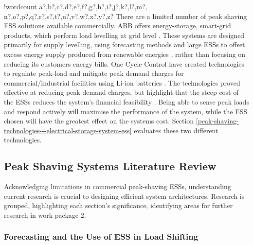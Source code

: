 \documentclass[fontsize=9.5pt]{extarticle}
\newcounter{words}
\newenvironment{counted}{%
  \setcounter{words}{0}
  \SearchList!{wordcount}{\stepcounter{words}}
    {a?,b?,c?,d?,e?,f?,g?,h?,i?,j?,k?,l?,m?,
    n?,o?,p?,q?,r?,s?,t?,u?,v?,w?,x?,y?,z?}
  \UndoBoundary{'}
  \SearchOrder{p;}}{%
  \StopSearching}
\begin{document}
\begin{counted}
There are a limited number of peak shaving ESS solutions available
commercially. ABB offers energy-storage, smart-grid products, which
perform load levelling at grid level \cite{abbpeakshave}. These systems
are designed primarily for supply levelling, using forecasting methods
and large ESSs to offset excess energy supply produced from renewable
energies \cite{5559470}, rather than focusing on reducing its customers
energy bills. One Cycle Control have created technologies to regulate
peak-load and mitigate peak demand charges for commercial/industrial
facilities using Li-ion batteries \cite{peakload38:online}. The
technologies proved effective at reducing peak demand charges, but
highlight that the steep cost of the ESSs reduces the system's financial
feasibility \cite{Demonstr51:online}. Being able to sense peak loads and
respond actively will maximise the performance of the system, while the
ESS chosen will have the greatest effect on the systems cost. Section
\ref{peak-shaving-technologies---electrical-storage-system-ess}
evaluates these two different technologies.

\subsection{Peak Shaving Systems Literature
Review}\label{peak-shaving-systems-literature-review}

Acknowledging limitations in commercial peak-shaving ESSs, understanding
current research is crucial to designing efficient system architectures.
Research is grouped, highlighting each section's significance,
identifying areas for further research in work package 2.

\subsubsection{Forecasting and the Use of ESS in Load
Shifting}\label{forecasting-and-the-use-of-ess-in-load-shifting}


\end{counted}
\end{document}
